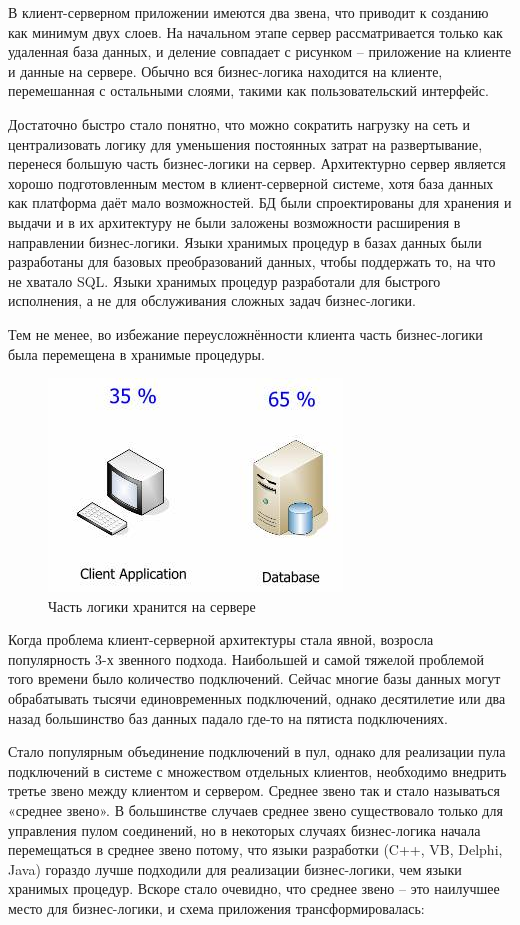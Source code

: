 \documentclass[a4paper, 14pt]{extarticle}
\begin{document}
В клиент-серверном приложении имеются два звена, что приводит к созданию как минимум двух слоев. На начальном этапе сервер рассматривается только как удаленная база данных, и деление совпадает с рисунком -- приложение на клиенте и данные на сервере. Обычно вся бизнес-логика находится на клиенте, перемешанная с остальными слоями, такими как пользовательский интерфейс.

Достаточно быстро стало понятно, что можно сократить нагрузку на сеть и централизовать логику для уменьшения постоянных затрат на развертывание, перенеся большую часть бизнес-логики на сервер. Архитектурно сервер является хорошо подготовленным местом в клиент-серверной системе, хотя база данных как платформа даёт мало возможностей. БД были спроектированы для хранения и выдачи и в их архитектуру не были заложены возможности расширения в направлении бизнес-логики. Языки хранимых процедур в базах данных были разработаны для базовых преобразований данных, чтобы поддержать то, на что не хватало SQL. Языки хранимых процедур разработали для быстрого исполнения, а не для обслуживания сложных задач бизнес-логики.

Тем не менее, во избежание переусложнённости клиента часть бизнес-логики была перемещена в хранимые процедуры.

\begin{figure}[!htb]
  \centering
    \includegraphics[scale=0.6]{../shared_images/business-logic/client-server-2.jpg}
   \caption{Часть логики хранится на сервере}
    \label{fig:start}
\end{figure}


Когда проблема клиент-серверной архитектуры стала явной, возросла популярность 3-х звенного подхода. Наибольшей и самой тяжелой проблемой того времени было количество подключений. Сейчас многие базы данных могут обрабатывать тысячи единовременных подключений, однако десятилетие или два назад большинство баз данных падало где-то на пятиста подключениях.

Стало популярным объединение подключений в пул, однако для реализации пула подключений в системе с множеством отдельных клиентов, необходимо внедрить третье звено между клиентом и сервером. Среднее звено так и стало называться «среднее звено». В большинстве случаев среднее звено существовало только для управления пулом соединений, но в некоторых случаях бизнес-логика начала перемещаться в среднее звено потому, что языки разработки (C++, VB, Delphi, Java) гораздо лучше подходили для реализации бизнес-логики, чем языки хранимых процедур. Вскоре стало очевидно, что среднее звено -- это наилучшее место для бизнес-логики, и схема приложения трансформировалась:
\end{document}
